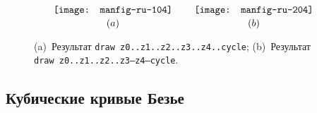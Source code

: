 \documentclass{article} %
\begin{document}
\begin{figure}[htp]
$$ {\texttt{[image: manfig-ru-104]} \atop (a)}
  \qquad {\texttt{[image: manfig-ru-204]} \atop (b)}
$$
\caption[Замкнутая кривая через пять точек]
        {(a)~Результат {\tt draw z0..\linebreak[0]z1..\linebreak[0]%
        z2..\linebreak[0]z3..\linebreak[0]z4..\linebreak[0]cycle};
        (b)~Результат {\tt draw z0..\linebreak[0]z1..\linebreak[0]%
        z2..\linebreak[0]z3--\linebreak[0]z4--\linebreak[0]cycle}.}
\label{fig3}
\end{figure}

\subsection{Кубические кривые Безье}
\end{document}
